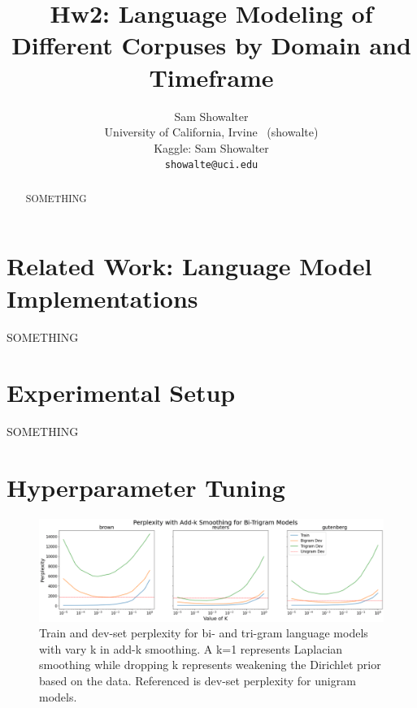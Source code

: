 \documentclass[11pt,a4paper]{article}
\title{Hw2: Language Modeling of Different Corpuses by Domain and Timeframe}
\author{Sam Showalter \\
  University of California, Irvine \ (showalte) \\  
  Kaggle: Sam Showalter \\
\texttt{showalte@uci.edu}}
\date{}
\begin{document}
\maketitle
\begin{abstract}
  SOMETHING \cite{chen1999empirical}
\end{abstract}


\section{Related Work: Language Model Implementations}

SOMETHING


\section{Experimental Setup}%
\label{sec:experimental_setup}

SOMETHING


\section{Hyperparameter Tuning}%
\label{sec:hyperparam_tuning}

\begin{figure}[htpb]
  \centering
  \includegraphics[width=1\linewidth]{imgs/smooth_all.png}
  \caption{Train and dev-set perplexity for bi- and tri-gram 
  language models with vary k in add-k smoothing. A k=1 represents
Laplacian smoothing while dropping k represents weakening the Dirichlet 
prior based on the data. Referenced is dev-set perplexity for unigram models.}
  \label{fig:imgs/smooth_all}
\end{figure}
\end{document}
